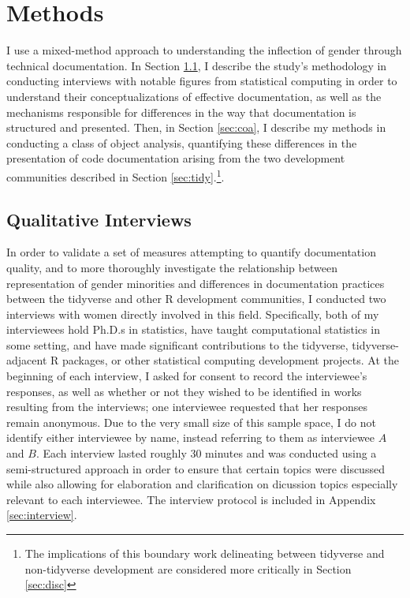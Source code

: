 \section{Methods}\label{sec:methods}

I use a mixed-method approach to understanding the inflection of gender through technical documentation. In Section \ref{sec:qual}, I describe the study's methodology in conducting interviews with notable figures from statistical computing in order to understand their conceptualizations of effective documentation, as well as the mechanisms responsible for differences in the way that documentation is structured and presented. Then, in Section \ref{sec:coa}, I describe my methods in conducting a class of object analysis, quantifying these differences in the presentation of code documentation arising from the two development communities described in Section \ref{sec:tidy}.\footnote{The implications of this boundary work delineating between tidyverse and non-tidyverse development are considered more critically in Section \ref{sec:disc}}.

\subsection{Qualitative Interviews}\label{sec:qual}

In order to validate a set of measures attempting to quantify documentation quality, and to more thoroughly investigate the relationship between representation of gender minorities and differences in documentation practices between the tidyverse and other R development communities, I conducted two interviews with women directly involved in this field. Specifically, both of my interviewees hold Ph.D.s in statistics, have taught computational statistics in some setting, and have made significant contributions to the tidyverse, tidyverse-adjacent R packages, or other statistical computing development projects. At the beginning of each interview, I asked for consent to record the interviewee's responses, as well as whether or not they wished to be identified in works resulting from the interviews; one interviewee requested that her responses remain anonymous. Due to the very small size of this sample space, I do not identify either interviewee by name, instead referring to them as interviewee $A$ and $B$. Each interview lasted roughly 30 minutes and was conducted using a semi-structured approach in order to ensure that certain topics were discussed while also allowing for elaboration and clarification on dicussion topics especially relevant to each interviewee. The interview protocol is included in Appendix \ref{sec:interview}.

